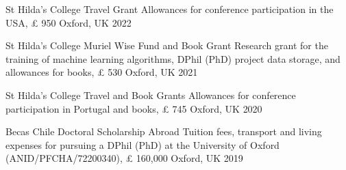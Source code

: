 





\vspace{1mm}

\begin{cvhonors}
\cvhonor
{St Hilda's College Travel Grant} 
{Allowances for conference participation in the USA, {\pounds} 950} 
{Oxford, UK}
{2022}
\end{cvhonors}

\vspace{1mm}

\begin{cvhonors}
\cvhonor
{St Hilda's College Muriel Wise Fund and Book Grant} 
{Research grant for the training of machine learning algorithms, DPhil (PhD) project data storage, and allowances for books, {\pounds} 530} 
{Oxford, UK}
{2021}
\end{cvhonors}

\vspace{1mm}

\begin{cvhonors}
\cvhonor
{St Hilda's College Travel and Book Grants} 
{Allowances for conference participation in Portugal and books, {\pounds} 745} 
{Oxford, UK}
{2020}
\end{cvhonors}

\vspace{1mm}

\begin{cvhonors}
\cvhonor
{Becas Chile Doctoral Scholarship Abroad} 
{Tuition fees, transport and living expenses for pursuing a DPhil (PhD) at the University of Oxford (ANID/PFCHA/72200340), {\pounds} 160,000}
{Oxford, UK}
{2019}
\end{cvhonors}

